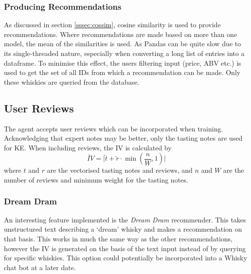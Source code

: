\subsubsection{Producing Recommendations}
As discussed in section \ref{sssec:cossim}, cosine similarity is used to provide recommendations.
Where recommendations are made based on more than one model, the mean of the similarities is used.
As Pandas can be quite slow due to its single-threaded nature, especially
when converting a long list of entries into a dataframe. To minimise this effect, the users filtering input 
(price, ABV etc.) is used to get the set of all IDs from which a recommendation can be made.
Only these whiskies are queried from the database.

\subsection{User Reviews}
The agent accepts user reviews which can be incorporated when training. Acknowledging that expert notes may be better,
only the tasting notes are used for KE. When including reviews, the IV is calculated by
\begin{equation}\label{eqn:revweight}
    \utilde{IV} = \vert \utilde{t} + \utilde{r} \cdot \min(\frac{n}{W}, 1) \vert 
\end{equation}
where $t$ and $r$ are the vectorised tasting notes and reviews, and $n$ and $W$ are the number of reviews and minimum weight 
for the tasting notes.

\subsubsection{Dream Dram}
An interesting feature implemented is the \emph{Dream Dram} recommender.  This takes unstructured text describing
a `dream' whisky and makes a recommendation on that basis. This works in much the same way as the other recommendations, 
however the IV is generated on the basis of the text input instead of by querying for specific whiskies. This option 
could potentially be incorporated into a Whisky chat bot at a later date.
